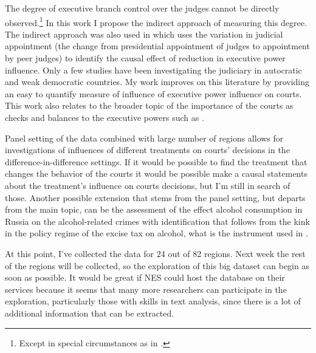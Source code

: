 \documentclass[a4paper,12pt]{article}
\numberwithin{equation}{problem}
\begin{document}
The degree of executive branch control over the judges cannot be directly observed.\footnote{Except in special circumstances as in \citet{Mcmillan2004}.} 
In this work I propose the indirect approach of measuring this degree.
The indirect approach was also used in \citet{Mehmood2022} which uses the variation in judicial appointment (the change from presidential appointment of judges to appointment by peer judges) to identify the causal effect of reduction in executive power influence. 
Only a few studies have been investigating the judiciary in autocratic and weak democratic countries. 
My work improves on this literature by providing an easy to quantify measure of influence of executive power influence on courts.
This work also relates to the broader topic of the importance of the courts as checks and balances to the executive powers such as \citet{North1990,Acemoglu2001, LaPorta2004,Rodrik2004}. 




Panel setting of the data combined with large number of regions allows for investigations of influences of different treatments on courts' decisions in the difference-in-difference settings. 
If it would be possible to find the treatment that changes the behavior of the courts it would be possible make a causal statements about the treatment's influence on courts decisions, but I'm still in search of those.
Another possible extension that stems from the panel setting, but departs from the main topic, can be the assessment of the effect alcohol consumption in Russia on the alcohol-related crimes with identification that follows from the kink in the policy regime of the excise tax on alcohol, what is the instrument used in \citet{Yakovlev2018}.


At this point, I've collected the data for 24 out of 82 regions. Next week the rest of the regions will be collected, so the exploration of this big dataset can begin as soon as possible. It would be great if NES could host the database on their services because it seems that many more researchers can participate in the exploration, particularly those with skills in text analysis, since there is a lot of additional information that can be extracted.

\end{document}
